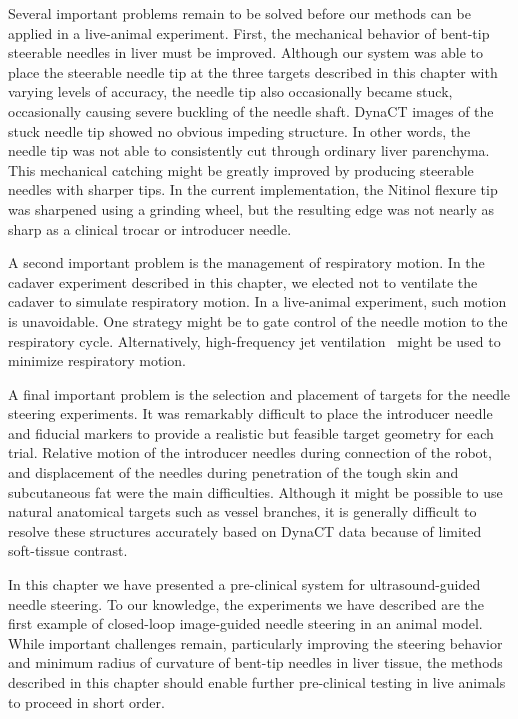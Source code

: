 Several important problems remain to be solved before our methods can be applied in a live-animal experiment. First, the mechanical behavior of bent-tip steerable needles in liver must be improved. Although our system was able to place the steerable needle tip at the three targets described in this chapter with varying levels of accuracy, the needle tip also occasionally became stuck, occasionally causing severe buckling of the needle shaft. DynaCT images of the stuck needle tip showed no obvious impeding structure. In other words, the needle tip was not able to consistently cut through ordinary liver parenchyma. This mechanical catching might be greatly improved by producing steerable needles with sharper tips. In the current implementation, the Nitinol flexure tip was sharpened using a grinding wheel, but the resulting edge was not nearly as sharp as a clinical trocar or introducer needle.

A second important problem is the management of respiratory motion. In the cadaver experiment described in this chapter, we elected not to ventilate the cadaver to simulate respiratory motion. In a live-animal experiment, such motion is unavoidable. One strategy might be to gate control of the needle motion to the respiratory cycle. Alternatively, high-frequency jet ventilation~\cite{Denys2014} might be used to minimize respiratory motion.

A final important problem is the selection and placement of targets for the needle steering experiments. It was remarkably difficult to place the introducer needle and fiducial markers to provide a realistic but feasible target geometry for each trial. Relative motion of the introducer needles during connection of the robot, and displacement of the needles during penetration of the tough skin and subcutaneous fat were the main difficulties. Although it might be possible to use natural anatomical targets such as vessel branches, it is generally difficult to resolve these structures accurately based on DynaCT data because of limited soft-tissue contrast.

In this chapter we have presented a pre-clinical system for ultrasound-guided needle steering. To our knowledge, the experiments we have described are the first example of closed-loop image-guided needle steering in an animal model. While important challenges remain, particularly improving the steering behavior and minimum radius of curvature of bent-tip needles in liver tissue, the methods described in this chapter should enable further pre-clinical testing in live animals to proceed in short order.  

